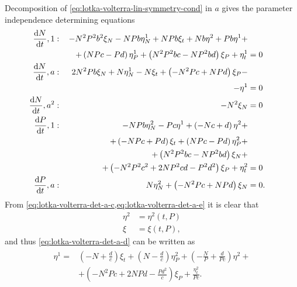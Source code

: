 Decomposition of \cref{eq:lotka-volterra-lin-symmetry-cond} in \(a\) gives the parameter independence determining equations
\begin{subequations}\label{eq:lotka-volterra-det-a}
  \begin{flalign}
    \diff{N}{t}, 1 & : & - N^{2} P^{2} b^{2} \xi_{N} - N P b \eta^1_{N} + N P b \xi_{t} + N b \eta^{2} + P b \eta^{1} +&&&\\
    &&\quad+ \left(N P c - P d\right) \eta^1_{P} + \left(N^{2} P^{2} b c - N P^{2} b d\right) \xi_{P} + \eta^1_{t} &= 0 && \FlLabel{eq:lotka-volterra-det-a-a}\\
    \diff{N}{t}, a & : & 2 N^{2} P b \xi_{N} + N \eta^1_{N} - N \xi_{t} + \left(- N^{2} P c + N P d\right) \xi_{P} -&&&\\
    &&\quad- \eta^{1} &= 0 && \FlLabel{eq:lotka-volterra-det-a-b}\\
    \diff{N}{t}, a^2 & : & - N^{2} \xi_{N} &= 0 && \FlLabel{eq:lotka-volterra-det-a-c}\\
    \diff{P}{t}, 1 & : & - N P b \eta^2_{N} - P c \eta^{1} + \left(- N c + d\right) \eta^{2} +&&&\\
    &&\quad+  \left(- N P c + P d\right) \xi_{t} + \left(N P c - P d\right) \eta^2_{P} +&&&\\
    &&\quad+ \left(N^{2} P^{2} b c - N P^{2} b d\right) \xi_{N} +&&&\\
    &&\quad+ \left(- N^{2} P^{2} c^{2} + 2 N P^{2} c d - P^{2} d^{2}\right) \xi_{P} + \eta^2_{t} &= 0 && \FlLabel{eq:lotka-volterra-det-a-d}\\
    \diff{P}{t}, a & : & N \eta^2_{N} + \left(- N^{2} P c + N P d\right) \xi_{N} &= 0. && \FlLabel{eq:lotka-volterra-det-a-e}
  \end{flalign}
\end{subequations}
From \cref{eq:lotka-volterra-det-a-c,eq:lotka-volterra-det-a-e} it is clear that
\begin{align}
  \eta^2 &= \eta^2(t, P)\\
  \xi &= \xi(t, P),
\end{align}
and thus \cref{eq:lotka-volterra-det-a-d} can be written as
\begin{align}
  \begin{split}
    \eta^{1} =& \left(- N + \frac{d}{c}\right) \xi_{t} + \left(N - \frac{d}{c}\right) \eta^2_{P} + \left(- \frac{N}{P} + \frac{d}{P c}\right) \eta^{2} +\\
    &+ \left(- N^{2} P c + 2 N P d - \frac{P d^{2}}{c}\right) \xi_{P} + \frac{\eta^2_{t}}{P c}.
  \end{split}
\end{align}
